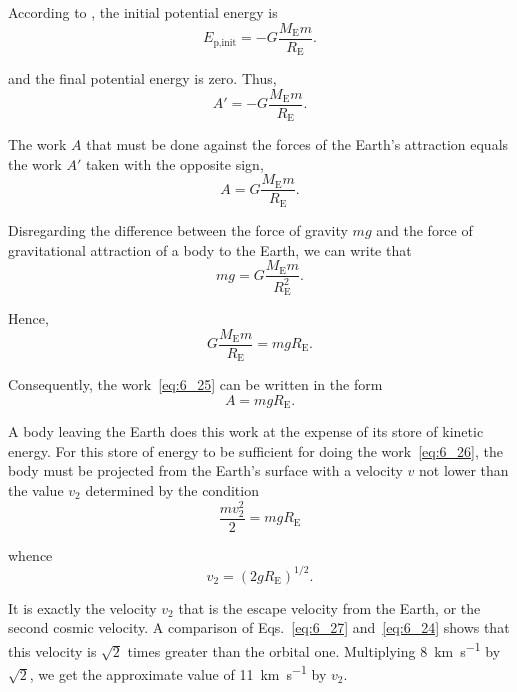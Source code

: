 \noindent
According to , the initial potential energy is
\begin{equation*}
	E_{\text{p,init}} = -G\frac{M_{\text{E}}m}{R_{\text{E}}}.
\end{equation*}

\noindent
and the final potential energy is zero. Thus,
\begin{equation*}
	A' = -G\frac{M_{\text{E}}m}{R_{\text{E}}}.
\end{equation*}

\noindent
The work $A$ that must be done against the forces of the Earth's attraction equals the work $A'$ taken with the opposite sign, \ie
\begin{equation}\label{eq:6_25}
	A = G\frac{M_{\text{E}}m}{R_{\text{E}}}.
\end{equation}

Disregarding the difference between the force of gravity $mg$ and the force of gravitational attraction of a body to the Earth, we can write that
\begin{equation*}
	mg = G\frac{M_{\text{E}}m}{R_{\text{E}}^2}.
\end{equation*}

\noindent
Hence,
\begin{equation*}
	G\frac{M_{\text{E}}m}{R_{\text{E}}} = mgR_{\text{E}}.
\end{equation*}

\noindent
Consequently, the work~\eqref{eq:6_25} can be written in the form
\begin{equation}\label{eq:6_26}
	A = mgR_{\text{E}}.
\end{equation}

A body leaving the Earth does this work at the expense of its store of kinetic energy. For this store of energy to be sufficient for doing the work~\eqref{eq:6_26}, the body must be projected from the Earth's surface with a velocity $v$ not lower than the value $v_2$ determined by the condition
\begin{equation*}
	\frac{mv_2^2}{2} = mgR_{\text{E}}
\end{equation*}

\noindent
whence
\begin{equation}\label{eq:6_27}
	v_2 = (2gR_{\text{E}})^{1/2}.
\end{equation}

\noindent
It is exactly the velocity $v_2$ that is the escape velocity from the Earth, or the second cosmic velocity. A comparison of Eqs.~\eqref{eq:6_27} and~\eqref{eq:6_24} shows that this velocity is $\sqrt{2}$ times greater than the orbital one. Multiplying \SI{8}{\kilo\metre\per\second} by $\sqrt{2}$, we get the approximate value of \SI{11}{\kilo\metre\per\second} by $v_2$.

